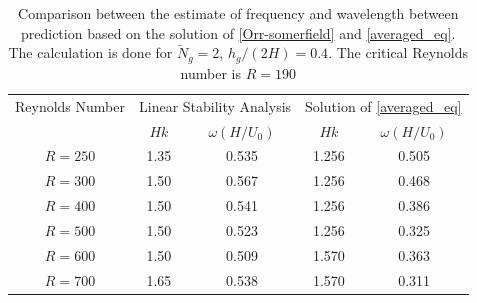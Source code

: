 \documentclass[12pt]{report}   %
\newcommand{\Ndg}{\tilde{N}_g}
\begin{document}
\begin{centering} 
\begin{table}
\begin{tabular}{|c|c|c|c|c|}
\hline
  Reynolds Number 
   &\multicolumn{2}{c|}{Linear Stability Analysis }&\multicolumn{2}{c|}{ Solution of \eqref{averaged_eq}}\\
\cline{2-5}
 & $H k$
 & $\omega (H/U_0)$ & $ H k$  &  $\omega (H/U_0)$ \\
\hline
$ R = 250 $ &    1.35 & 0.535 & 1.256 &  0.505 \\
$ R = 300 $ &    1.50 & 0.567 & 1.256 &  0.468 \\
$ R = 400 $ &    1.50 & 0.541 & 1.256 &  0.386 \\
$ R = 500 $ &	  1.50 & 0.523 & 1.256 &  0.325 \\
$ R = 600 $ &	  1.50 & 0.509 & 1.570 &  0.363 \\
$ R = 700 $ &     1.65 & 0.538 & 1.570 &  0.311 \\

\hline
\end{tabular}
 \caption{Comparison between the estimate of frequency and wavelength between prediction based on the solution of \eqref{Orr-somerfield} and \eqref{averaged_eq}. The calculation is done for $\Ndg=2$, $h_g/(2H)=0.4$. The critical Reynolds number is $R=190$}
 \label{tab:LinearStabilityVsCFD}
\end{table}
\end{centering}
\end{document}
